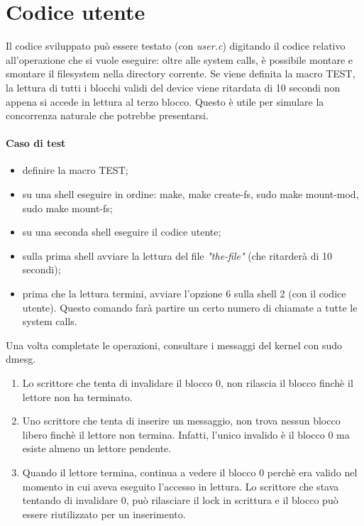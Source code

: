\documentclass[a4paper,12pt,oneside]{book}
\begin{document}
	\chapter{Codice utente}
	Il codice sviluppato può essere testato (con \emph{user.c}) digitando il codice relativo all'operazione che si vuole eseguire: oltre alle system calls, è possibile montare e smontare il filesystem nella directory corrente. Se viene definita la macro TEST, la lettura di tutti i blocchi validi del device viene ritardata di 10 secondi non appena si accede in lettura al terzo blocco. Questo è utile per simulare la concorrenza naturale che potrebbe presentarsi.

	\subsubsection{Caso di test}
\begin{itemize}
		\item definire la macro TEST;
		\item su una shell eseguire in ordine: make, make create-fs, sudo make mount-mod, sudo make mount-fs;
		\item su una seconda shell eseguire il codice utente;
		\item sulla prima shell avviare la lettura del file \emph{"the-file"} (che ritarderà di 10 secondi);
		\item prima che la lettura termini, avviare l'opzione 6 sulla shell 2 (con il codice utente). Questo comando farà partire un certo numero di chiamate a tutte le system calls.
\end{itemize}
Una volta completate le operazioni, consultare i messaggi del kernel con sudo dmesg.
\begin{enumerate}
	\item Lo scrittore che tenta di invalidare il blocco 0, non rilascia il blocco finchè il lettore non ha terminato.
	\item Uno scrittore che tenta di inserire un messaggio, non trova nessun blocco libero finchè il lettore non termina. Infatti, l'unico invalido è il blocco 0 ma esiste almeno un lettore pendente.
	\item Quando il lettore termina, continua a vedere il blocco 0 perchè era valido nel momento in cui aveva eseguito l'accesso in lettura. Lo scrittore che stava tentando di invalidare 0, può rilasciare il lock in scrittura e il blocco può essere riutilizzato per un inserimento.
\end{enumerate}
	
	
	
	
	
\end{document}
